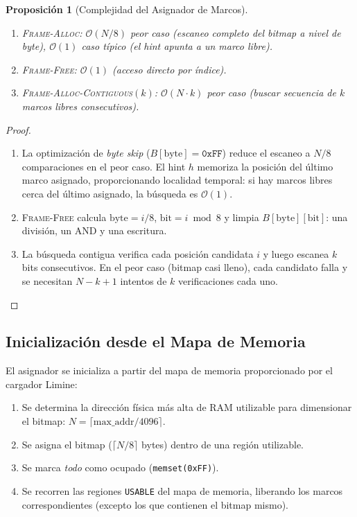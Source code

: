 \documentclass[11pt,twoside,openright]{book}
\theoremstyle{definition}
\theoremstyle{plain}
\newtheorem{proposition}[theorem]{Proposición}
\theoremstyle{remark}
\newcommand{\bigO}{\mathcal{O}}
\begin{document}
\begin{proposition}[Complejidad del Asignador de Marcos]
\label{prop:frame-alloc-complexity}
\leavevmode
\begin{enumerate}
    \item \textsc{Frame-Alloc}: $\bigO(N/8)$ peor caso (escaneo completo del bitmap a
          nivel de byte), $\bigO(1)$ caso típico (el hint apunta a un marco libre).
    \item \textsc{Frame-Free}: $\bigO(1)$ (acceso directo por índice).
    \item \textsc{Frame-Alloc-Contiguous}$(k)$: $\bigO(N \cdot k)$ peor caso
          (buscar secuencia de $k$ marcos libres consecutivos).
\end{enumerate}
\end{proposition}

\begin{proof}
\leavevmode
\begin{enumerate}
    \item La optimización de \emph{byte skip} ($B[\text{byte}] = \texttt{0xFF}$) reduce
          el escaneo a $N/8$ comparaciones en el peor caso. El hint $h$ memoriza la
          posición del último marco asignado, proporcionando localidad temporal: si
          hay marcos libres cerca del último asignado, la búsqueda es $\bigO(1)$.
    \item \textsc{Frame-Free} calcula $\text{byte} = i/8$, $\text{bit} = i \bmod 8$ y
          limpia $B[\text{byte}][\text{bit}]$: una división, un AND y una escritura.
    \item La búsqueda contigua verifica cada posición candidata $i$ y luego escanea
          $k$ bits consecutivos. En el peor caso (bitmap casi lleno), cada candidato
          falla y se necesitan $N - k + 1$ intentos de $k$ verificaciones cada uno.
\end{enumerate}
\end{proof}

\subsection{Inicialización desde el Mapa de Memoria}

El asignador se inicializa a partir del mapa de memoria proporcionado por el cargador
Limine:

\begin{enumerate}
    \item Se determina la dirección física más alta de RAM utilizable para dimensionar
          el bitmap: $N = \lceil \text{max\_addr} / 4096 \rceil$.
    \item Se asigna el bitmap ($\lceil N/8 \rceil$ bytes) dentro de una región utilizable.
    \item Se marca \emph{todo} como ocupado (\texttt{memset(0xFF)}).
    \item Se recorren las regiones \texttt{USABLE} del mapa de memoria, liberando los
          marcos correspondientes (excepto los que contienen el bitmap mismo).
\end{enumerate}
\end{document}
